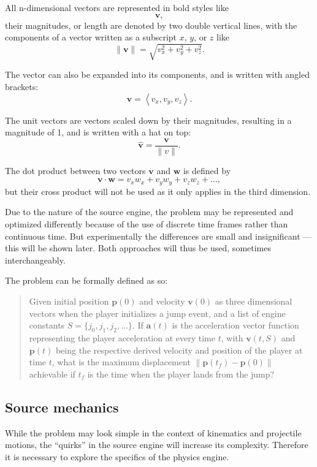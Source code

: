 \documentclass[a4paper,12pt]{article}
\newcommand{\tvec}[1]{\boldsymbol{#1}}
\newcommand{\tunit}[1]{\boldsymbol{\hat{#1}}}
\newcommand{\tmag}[1]{\|#1\|}
\newcommand{\tang}[1]{\left\langle #1 \right\rangle}
\newcommand{\ta}{\tvec{a}}
\newcommand{\tv}{\tvec{v}}
\newcommand{\tp}{\tvec{p}}
\begin{document}
All n-dimensional vectors are represented in bold styles like
\[
    \tvec{v},
\]
their magnitudes, or length are denoted by two double vertical lines, with the components of a vector written as a subscript $x$, $y$, or $z$ like
\[
    \tmag{\tvec{v}} = \sqrt{v_x^2 + v_y^2 + v_z^2}.
\]

The vector can also be expanded into its components, and is written with angled brackets:
\[
    \tvec{v} = \tang{v_x, v_y, v_z}.
\]

The unit vectors are vectors scaled down by their magnitudes, resulting in a magnitude of 1, and is written with a hat on top:
\[
    \tunit{v} = \frac{\tvec{v}}{\tmag{v}}.
\]

The dot product between two vectors $\tvec{v}$ and $\tvec{w}$ is defined by
\[
    \tvec{v} \cdot \tvec{w} = v_x w_x + v_y w_y + v_z w_z + \ldots,
\]
but their cross product will not be used as it only applies in the third dimension.

Due to the nature of the source engine, the problem may be represented and optimized differently because of the use of discrete time frames rather than continuous time. But experimentally the differences are small and insignificant --- this will be shown later. Both approaches will thus be used, sometimes interchangeably.

The problem can be formally defined as so:
\begin{quote}
    Given initial position $\tvec{p}(0)$ and velocity $\tvec{v}(0)$ as three dimensional vectors when the player initializes a jump event, and a list of engine constants $S = \{j_0, j_1, j_2, \ldots\}$. If $\ta(t)$ is the acceleration vector function representing the player acceleration at every time $t$, with $\tv(t, S)$ and $\tp(t)$ being the respective derived velocity and position of the player at time $t$, what is the maximum displacement $\tmag{\tp(t_f) - \tp(0)}$ achievable if $t_f$ is the time when the player lands from the jump?
\end{quote}

\subsection{Source mechanics}
While the problem may look simple in the context of kinematics and projectile motions, the ``quirks'' in the source engine will increase its complexity. Therefore it is necessary to explore the specifics of the physics engine.
\end{document}
